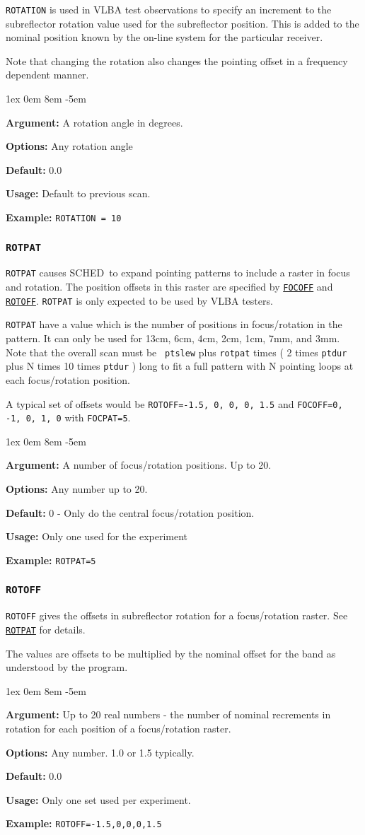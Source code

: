 \documentclass{report}
\newcommand{\schedb}{{\sc SCHED~}}
\newcommand{\rcwbox}[5]{
  \begin{list}{}{\parsep 1ex  \itemsep 0em
                 \leftmargin 8em  \itemindent -5em }
    \item {\bf Argument:} #1
    \item {\bf Options:}  #2
    \item {\bf Default:}  #3
    \item {\bf Usage:}    #4
    \item {\bf Example:}  #5
  \end{list}
}
\begin{document}
{\tt ROTATION} is used in VLBA test observations to specify an
increment to the subreflector rotation value used for the subreflector
position.  This is added to the nominal position known by the on-line
system for the particular receiver.

Note that changing the rotation also changes the pointing offset
in a frequency dependent manner.

\rcwbox
{A rotation angle in degrees.}
{Any rotation angle}
{0.0}
{Default to previous scan.}
{{\tt ROTATION = 10 }}

\subsubsection{\label{MP:ROTPAT}\tt ROTPAT}

{\tt ROTPAT} causes \schedb to expand pointing patterns to include
a raster in focus and rotation.  The position offsets in this
raster are specified by 
{\hyperref[MP:FOCOFF]{{\tt FOCOFF}}} and
{\hyperref[MP:ROTOFF]{{\tt ROTOFF}}}.  {\tt ROTPAT} is only expected
to be used by VLBA testers.

{\tt ROTPAT} have a value which is the number of positions in
focus/rotation in the pattern.  It can only be used for 13cm, 6cm,
4cm, 2cm, 1cm, 7mm, and 3mm.  Note that the overall scan must be {\tt
ptslew} plus {\tt rotpat} times ( 2 times {\tt ptdur} plus N times 10
times {\tt ptdur} ) long to fit a full pattern with N pointing loops
at each focus/rotation position.

A typical set of offsets would be {\tt ROTOFF=-1.5, 0, 0, 0, 1.5}
and {\tt FOCOFF=0, -1, 0, 1, 0} with {\tt FOCPAT=5}.

\rcwbox
{A number of focus/rotation positions.  Up to 20.}
{Any number up to 20.}
{0 - Only do the central focus/rotation position.}
{Only one used for the experiment}
{{\tt ROTPAT=5}}

\subsubsection{\label{MP:ROTOFF}\tt ROTOFF}

{\tt ROTOFF} gives the offsets in subreflector rotation for a
focus/rotation raster.  See 
{\hyperref[MP:ROTPAT]{{\tt ROTPAT}}} for
details.

The values are offsets to be multiplied by the nominal offset
for the band as understood by the program.

\rcwbox
{Up to 20 real numbers - the number of nominal recrements in
rotation for each position of a focus/rotation raster.}
{Any number.  1.0 or 1.5 typically.}
{0.0}
{Only one set used per experiment.}
{{\tt ROTOFF=-1.5,0,0,0,1.5}}
\end{document}
